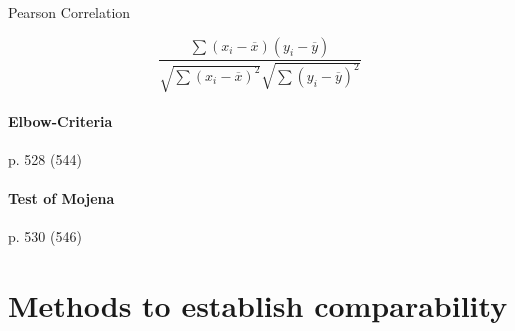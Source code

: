 Pearson Correlation  \cite{Nettleton2014, Berman2016}

\begin{equation}
\frac{\sum (x_i - \overline{x})(y_i -
\overline{y})}{\sqrt{\sum{(x_i - \overline{x})^2}}{\sqrt{\sum{(y_i - \overline{y})^2}}}}
\end{equation}


\paragraph{Elbow-Criteria}

\cite{Backhaus2016} p. 528 (544)

\paragraph{Test of Mojena}

\cite{Backhaus2016} p. 530 (546)

\section{Methods to establish comparability}